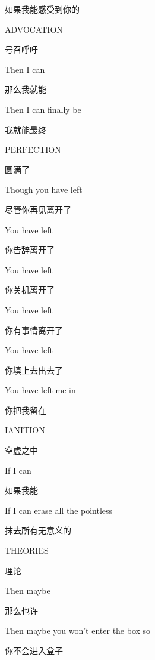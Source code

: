 \documentclass[UTF8,12pt,oneside]{ctexbook}
\begin{document}
\begin{center}
            如果我能感受到你的
            
            ADVOCATION
            
            号召呼吁
            
            Then I can
            
            那么我就能
            
            Then I can finally be
            
            我就能最终
            
            PERFECTION
            
            圆满了
            
            Though you have left
            
            尽管你再见离开了
            
            You have left
            
            你告辞离开了
            
            You have left
            
            你关机离开了
            
            You have left
            
            你有事情离开了
            
            You have left
            
            你填上去出去了
            
            You have left me in
            
            你把我留在
            
            IANITION
            
            空虚之中
            
            If I can
            
            如果我能
            
            If I can erase all the pointless
            
            抹去所有无意义的
            
            THEORIES
            
            理论
            
            Then maybe
            
            那么也许
            
            Then maybe you won’t enter the box so
            
            你不会进入盒子
            

\end{center}
\end{document}
